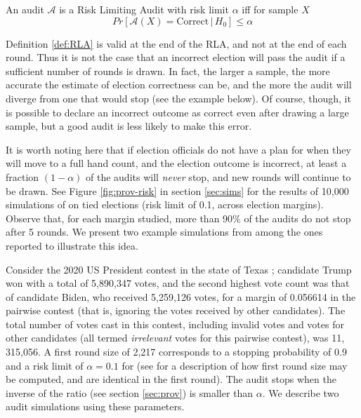 \begin{definition}
\label{def:RLA}
An audit $\mathcal{A}$ is a Risk Limiting Audit with 
risk limit $\alpha$ iff for sample $X$
$$
Pr[\mathcal{A}(X) 
= \text{Correct} \,|\, H_0]\le \alpha
$$
\end{definition}

Definition \ref{def:RLA} is valid at the end of the RLA, and not at the end of each round. Thus it is not the case that an incorrect election will pass the audit if a sufficient number of rounds is drawn. In fact, the larger a sample, the more accurate the estimate of election correctness can be, and the more the audit will diverge from one that would stop (see the example below). Of course, though, it is possible to declare an incorrect outcome as correct even after drawing a large sample, but a good audit is less likely to make this error. 


 It is worth noting here that if election officials do not have a plan for when they will move to a full hand count, and the election outcome is incorrect, at least a fraction $(1-\alpha)$ of the audits will {\em never} stop, and new rounds will continue to be drawn. See Figure \ref{fig:prov-risk} in section \ref{sec:sims} for the results of 10,000 simulations of \Providence on tied elections (risk limit of 0.1, across election margins). Observe that, for each margin studied, more than 90\% of the audits do not stop after 5 rounds. We present two example simulations from among the ones reported to illustrate this idea. 

Consider the 2020 US President contest in the state of Texas \cite{MIT-Data-Lab}; candidate Trump won with a total of 5,890,347 votes, and the second highest vote count was that of candidate Biden, who received 5,259,126 votes, for a margin of 0.056614 in the pairwise contest (that is, ignoring the votes received by other candidates). The total number of votes cast in this contest, including invalid votes and votes for other candidates (all termed {\em irrelevant} votes for this pairwise contest), was 11, 315,056. A first round size of 2,217 corresponds to a stopping probability of 0.9 and a risk limit of $\alpha=0.1$ for \Providence (see \cite{usenix_minerva} for a description of how first round size may be computed, \Minerva and \Providence are identical in the first round). The audit stops when the inverse of the \Providence ratio (see section \ref{sec:prov}) is smaller than $\alpha$. We describe two audit simulations using these parameters. 

